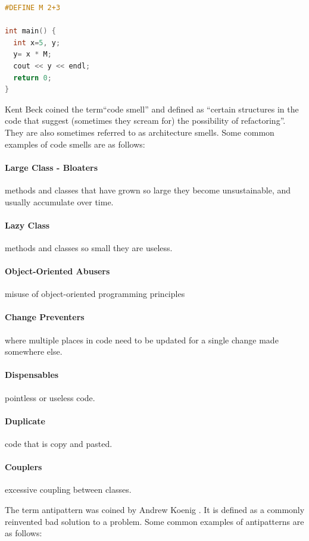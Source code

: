 \documentclass[conference]{IEEEtran}
\begin{document}
\begin{lstlisting}[language=C,frame=single,caption=Example Atom of Confusion,label=pattern1]
#DEFINE M 2+3

int main() {
  int x=5, y;
  y= x * M;
  cout << y << endl;
  return 0;
}
\end{lstlisting}

Kent Beck coined the term``code smell'' \cite{fowler_refactoring:_2018} and defined as ``certain structures in the code that suggest (sometimes they scream for) the possibility of refactoring''. They are also sometimes referred to as architecture smells.
Some common examples of code smells are as follows:
\paragraph{Large Class - Bloaters} methods and classes that have grown so large they become unsustainable, and usually accumulate over time.
\paragraph{Lazy Class} methods and classes so small they are useless.
\paragraph{Object-Oriented Abusers} misuse of object-oriented programming principles
\paragraph{Change Preventers} where multiple places in code need to be updated for a single change made somewhere else.
\paragraph{Dispensables} pointless or useless code.
\paragraph{Duplicate} code that is copy and pasted.
\paragraph{Couplers} excessive coupling between classes.

The term antipattern was coined by Andrew Koenig \cite{koenig_patterns_1998}. 
It is defined as a commonly reinvented bad solution to a problem.
Some common examples of antipatterns are as follows:
\end{document}
